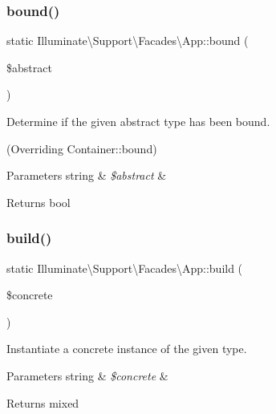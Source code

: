 \subsubsection{\texorpdfstring{bound()}{bound()}}
{\footnotesize\ttfamily static Illuminate\textbackslash{}\+Support\textbackslash{}\+Facades\textbackslash{}\+App\+::bound (\begin{DoxyParamCaption}\item[{}]{\$abstract }\end{DoxyParamCaption})\hspace{0.3cm}{\ttfamily [static]}}

Determine if the given abstract type has been bound.

(Overriding Container\+::bound)


\begin{DoxyParams}[1]{Parameters}
string & {\em \$abstract} & \\
\hline
\end{DoxyParams}
\begin{DoxyReturn}{Returns}
bool 
\end{DoxyReturn}
\mbox{\label{class_illuminate_1_1_support_1_1_facades_1_1_app_afc58bf4ad412d93583b845767132ac6a}} 
\subsubsection{\texorpdfstring{build()}{build()}}
{\footnotesize\ttfamily static Illuminate\textbackslash{}\+Support\textbackslash{}\+Facades\textbackslash{}\+App\+::build (\begin{DoxyParamCaption}\item[{}]{\$concrete }\end{DoxyParamCaption})\hspace{0.3cm}{\ttfamily [static]}}

Instantiate a concrete instance of the given type.


\begin{DoxyParams}[1]{Parameters}
string & {\em \$concrete} & \\
\hline
\end{DoxyParams}
\begin{DoxyReturn}{Returns}
mixed 
\end{DoxyReturn}

